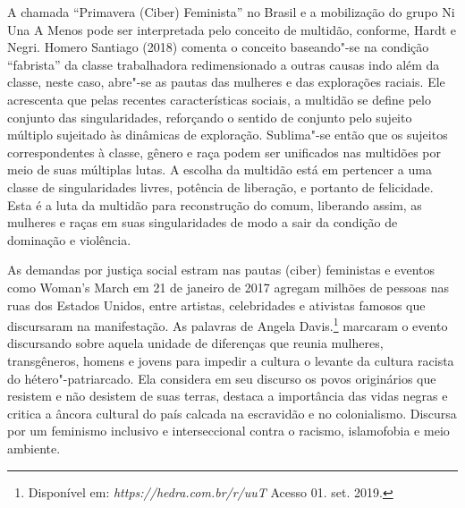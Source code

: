A chamada ``Primavera (Ciber) Feminista'' no Brasil e a mobilização do
grupo Ni Una A Menos pode ser interpretada pelo conceito de multidão,
conforme, Hardt e Negri. Homero Santiago (2018) comenta o conceito
baseando"-se na condição ``fabrista'' da classe trabalhadora
redimensionado a outras causas indo além da classe, neste caso, abre"-se
as pautas das mulheres e das explorações raciais. Ele acrescenta que
pelas recentes características sociais, a multidão se define pelo
conjunto das singularidades, reforçando o sentido de conjunto pelo
sujeito múltiplo sujeitado às dinâmicas de exploração. Sublima"-se então
que os sujeitos correspondentes à classe, gênero e raça podem ser
unificados nas multidões por meio de suas múltiplas lutas. A escolha da
multidão está em pertencer a uma classe de singularidades livres,
potência de liberação, e portanto de felicidade. Esta é a luta da
multidão para reconstrução do comum, liberando assim, as mulheres e
raças em suas singularidades de modo a sair da condição de dominação e
violência.

As demandas por justiça social estram nas pautas (ciber) feministas e
eventos como Woman's March em 21 de janeiro de 2017 agregam milhões de
pessoas nas ruas dos Estados Unidos, entre artistas, celebridades e
ativistas famosos que discursaram na manifestação. As palavras de Angela
Davis.\footnote{Disponível em:
  \emph{https://hedra.com.br/r/uuT}
  Acesso 01. set. 2019.} marcaram o evento discursando sobre aquela
unidade de diferenças que reunia mulheres, transgêneros, homens e jovens
para impedir a cultura o levante da cultura racista do
hétero"-patriarcado. Ela considera em seu discurso os povos originários
que resistem e não desistem de suas terras, destaca a importância das
vidas negras e critica a âncora cultural do país calcada na escravidão e
no colonialismo. Discursa por um feminismo inclusivo e interseccional
contra o racismo, islamofobia e meio ambiente.

